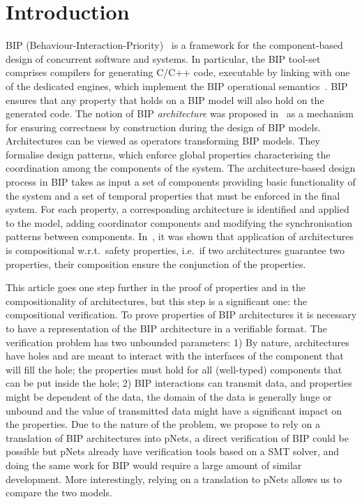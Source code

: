\documentclass{llncs}
\newcommand{\ie}[1][\ ]{i.e.#1}
\newcommand{\eg}[1][\ ]{e.g.#1}
\newcommand{\wrt}[1][\ ]{w.r.t.#1}
\begin{document}
\section{Introduction}
\label{secn:introduction}

BIP (Behaviour-Interaction-Priority)~\cite{bip} is a framework for the
component-based design of concurrent software and systems.  In
particular, the BIP tool-set comprises compilers for generating C/C++
code, executable by linking with one of the dedicated engines, which
implement the BIP operational semantics~\cite{BliSif08-acp-tc}.
BIP ensures that any property that holds on a BIP
model will also hold on the generated code.
The notion of BIP \emph{architecture} was proposed
in~\cite{AttieBBJS16-architectures-faoc} as a mechanism for ensuring
correctness by construction during the design of BIP models.
Architectures can be viewed as operators transforming BIP models.
They formalise design patterns, which enforce global properties
characterising the coordination among the components of the system.
The architecture-based design process in BIP takes as input a set of
components providing basic functionality of the system and a set of
temporal properties that must be enforced in the final system.  For
each property, a corresponding architecture is identified
and applied to the model, adding
coordinator components and modifying the 
synchronisation patterns between components.
In~\cite{AttieBBJS16-architectures-faoc}, it was shown that
application of architectures is compositional \wrt safety properties,
\ie if two architectures guarantee two properties, their composition ensure the conjunction of the properties.
%

This article goes one step further in the proof of properties and in the compositionality of architectures, but this step is a significant one: the compositional verification. To prove properties of BIP architectures
it is necessary to have a representation of the BIP architecture in a verifiable format. 
The verification problem has two unbounded parameters: 1) By nature, architectures have holes and are meant to interact with the interfaces of the component that will fill the hole; the properties must hold for all (well-typed) components that can be put inside the hole; 2) BIP interactions can transmit data, and properties might be dependent of the data, the domain of the data is generally huge or unbound and the value of transmitted data might have a significant impact on the properties.
Due to the nature of the problem, we propose to rely on a translation of BIP architectures into pNets, a direct verification of BIP could  be possible but pNets already have verification tools based on a SMT solver, and doing the same work for BIP would require  a large amount of similar development. More interestingly, relying on a translation to pNets allows us to compare the two models.
\end{document}
